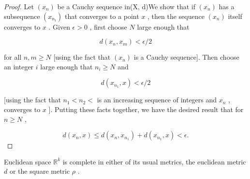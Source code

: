 \begin{proof}Let \(\left( {x}_{n}\right)\) be a Cauchy sequence in(X, d)We show that if \(\left( {x}_{n}\right)\) has a subsequence \(\left( {x}_{{n}_{t}}\right)\) that converges to a point \(x\) , then the sequence \(\left( {x}_{n}\right)\) itself converges to \(x\) .
Given \(\epsilon  > 0\) , first choose \(N\) large enough that

\[
d\left( {{x}_{n},{x}_{m}}\right)  < \epsilon /2
\]

for all \(n,m \geq  N\) [using the fact that \(\left( {x}_{n}\right)\) is a Cauchy sequence]. Then choose an integer \(i\) large enough that \({n}_{i} \geq  N\) and

\[
d\left( {{x}_{{n}_{1}},x}\right)  < \epsilon /2
\]

[using the fact that \({n}_{1} < {n}_{2} <\) is an increasing sequence of integers and \({x}_{n}\) , converges to \(x\) ]. Putting these facts together, we have the desired result that for \(n \geq  N\) ,

\[
d\left( {{x}_{n},x}\right)  \leq  d\left( {{x}_{n},{x}_{{n}_{1}}}\right)  + d\left( {{x}_{{n}_{1}},x}\right)  < \epsilon .
\]
\end{proof}
\begin{theorem} Euclidean space \({\mathbb{R}}^{k}\) is complete in either of its usual metrics, the euclidean metric \(d\) or the square metric \(\rho\) .
\end{theorem}

